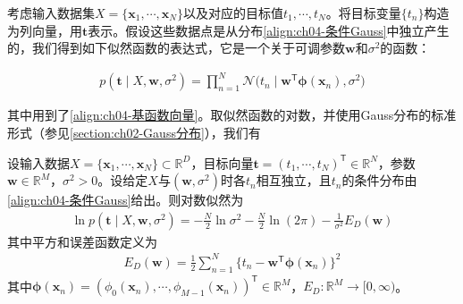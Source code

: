 \documentclass[../../main.tex]{subfiles}
\begin{document}
考虑输入数据集$X=\{\boldsymbol{x}_1,\cdots,\boldsymbol{x}_N\}$以及对应的目标值$t_1,\cdots,t_N$。将目标变量$\{t_n\}$构造为列向量，用$\boldsymbol{t}$表示。假设这些数据点是从分布\eqref{align:ch04-条件Gauss}中独立产生的，我们得到如下似然函数的表达式，它是一个关于可调参数$\boldsymbol{w}$和$\sigma^2$的函数：

\begin{align}
  p(\boldsymbol{t}\mid X,\boldsymbol{w},\sigma^2)=\prod_{n=1}^{N}\mathcal{N}\bigl(t_n\mid\boldsymbol{w}^{\mathsf{T}}\boldsymbol{\phi}(\boldsymbol{x}_n),\sigma^2\bigr)
  \label{align:ch04-回归似然}
\end{align}

其中用到了\eqref{align:ch04-基函数向量}。取似然函数的对数，并使用Gauss分布的标准形式（参见\cref{section:ch02-Gauss分布}），我们有

\begin{proposition}[回归问题的对数似然]\label{proposition:ch04-对数似然}
设输入数据$X=\{\boldsymbol{x}_1,\cdots,\boldsymbol{x}_N\}\subset\mathbb{R}^{D}$，目标向量$\boldsymbol{t}=(t_1,\cdots,t_N)^{\mathsf{T}}\in\mathbb{R}^{N}$，参数$\boldsymbol{w}\in\mathbb{R}^{M}$，$\sigma^{2}>0$。设给定$X$与$(\boldsymbol{w},\sigma^{2})$时各$t_n$相互独立，且$t_n$的条件分布由\eqref{align:ch04-条件Gauss}给出。则对数似然为
\begin{align}
  \ln p(\boldsymbol{t}\mid X,\boldsymbol{w},\sigma^2)
  =-\frac{N}{2}\ln\sigma^2-\frac{N}{2}\ln(2\pi)-\frac{1}{\sigma^2}E_D(\boldsymbol{w})
  \label{align:ch04-回归对数似然}
\end{align}
其中平方和误差函数定义为
\begin{align}
  E_D(\boldsymbol{w})=\frac{1}{2}\sum_{n=1}^{N}\bigl\{t_n-\boldsymbol{w}^{\mathsf{T}}\boldsymbol{\phi}(\boldsymbol{x}_n)\bigr\}^2
  \label{align:ch04-平方和误差}
\end{align}
其中$\boldsymbol{\phi}(\boldsymbol{x}_n)=(\phi_0(\boldsymbol{x}_n),\cdots,\phi_{M-1}(\boldsymbol{x}_n))^{\mathsf{T}}\in\mathbb{R}^{M}$，$E_D:\mathbb{R}^{M}\to[0,\infty)$。
\end{proposition}
\end{document}
